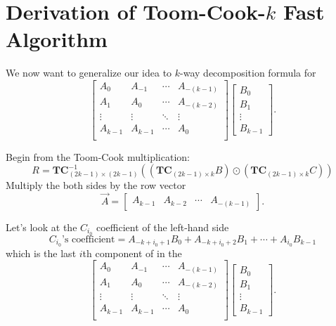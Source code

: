 \documentclass[
11pt,notheorems,hyperref={pdfauthor=whatever}
]{beamer}
\begin{document}
\section{Derivation of Toom-Cook-$k$ Fast Algorithm}
\begin{frame}
    We now want to generalize our idea to $k$-way decomposition formula for
    \[
    \begin{bmatrix}
        A_{0} & A_{-1} & \cdots &A_{-(k-1)}\\
        A_{1} & A_{0} & \cdots &A_{-(k-2)}\\
        \vdots & \vdots & \ddots & \vdots\\
        A_{k-1} & A_{k-1} & \cdots &A_{0}\\
    \end{bmatrix}
    \begin{bmatrix}
        B_{0} \\ B_{1} \\ \vdots \\ B_{k-1}
    \end{bmatrix}.
    \]

\end{frame}
\begin{frame}
    Begin from the Toom-Cook multiplication:
    \[
    R=\mathbf{TC}_{(2k-1)\times (2k-1)}^{-1}\left(
        \left(\mathbf{TC}_{(2k-1)\times k}B\right)\odot
        \left(\mathbf{TC}_{(2k-1)\times k}C\right)
    \right)
    \]
    Multiply the both sides by the row vector
    \[
    \vec{A} = \begin{bmatrix} A_{k-1} & A_{k-2} & \cdots & A_{-(k-1)}\end{bmatrix}.
    \]
\end{frame}

\begin{frame}
    Let's look at the $C_{i_0}$ coefficient of the left-hand side
    \[
    C_{i_0}\text{'s coefficient}
    =
    A_{-k+i_{0}+1}B_{0} + A_{-k+i_{0}+2}B_{1} + \cdots + A_{i_{0}} B_{k-1}
    \]
    which is the last $i$th component of in the
    \[
    \begin{bmatrix}
        A_{0} & A_{-1} & \cdots &A_{-(k-1)}\\
        A_{1} & A_{0} & \cdots &A_{-(k-2)}\\
        \vdots & \vdots & \ddots & \vdots\\
        A_{k-1} & A_{k-1} & \cdots &A_{0}\\
    \end{bmatrix}
    \begin{bmatrix}
        B_{0} \\ B_{1} \\ \vdots \\ B_{k-1}
    \end{bmatrix}.
    \]

\end{frame}
\end{document}
